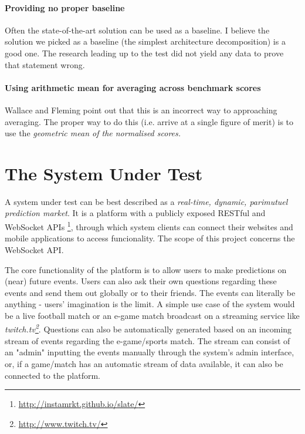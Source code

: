 \documentclass{uvamscse}
\begin{document}
\subsubsection{Providing no proper baseline}
Often the state-of-the-art solution can be used as a baseline. I believe the solution we picked as a baseline (the simplest architecture decomposition) is a good one. The research leading up to the test did not yield any data to prove that statement wrong.

\subsubsection{Using arithmetic mean for averaging across benchmark scores}
Wallace and Fleming \cite{Fleming} point out that this is an incorrect way to approaching averaging.
The proper way to do this (i.e. arrive at a single figure of merit) is to use the \textit{geometric mean of the normalised scores.}


\chapter{The System Under Test}\label{The System Under Test}

A system under test can be best described as a \textit{real-time, dynamic, parimutuel prediction market}. It is a platform with a publicly exposed RESTful and WebSocket APIs \footnote{\url{http://instamrkt.github.io/slate/}}, through which system clients can connect their websites and mobile applications to access funcionality. The scope of this project concerns the WebSocket API.

The core functionality of the platform is to allow users to make predictions on (near) future events. Users can also ask their own questions regarding these events and send them out globally or to their friends. The events can literally be anything - users' imagination is the limit. A simple use case of the system would be a live football match or an e-game match broadcast on a streaming service like \textit{twitch.tv\footnote{\url{http://www.twitch.tv/}}}. Questions can also be automatically generated based on an incoming stream of events regarding the e-game/sports match. The stream can consist of an "admin" inputting the events manually through the system's admin interface, or, if a game/match has an automatic stream of data available, it can also be connected to the platform.
\end{document}
